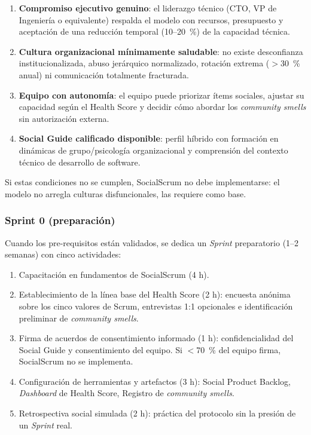 \begin{enumerate}
    \item \textbf{Compromiso ejecutivo genuino}: el liderazgo técnico (CTO, VP de Ingeniería o equivalente) respalda el modelo con recursos, presupuesto y aceptación de una reducción temporal (10--20~\%) de la capacidad técnica.
    \item \textbf{Cultura organizacional mínimamente saludable}: no existe desconfianza institucionalizada, abuso jerárquico normalizado, rotación extrema ($>$30~\% anual) ni comunicación totalmente fracturada.
    \item \textbf{Equipo con autonomía}: el equipo puede priorizar ítems sociales, ajustar su capacidad según el Health Score y decidir cómo abordar los \textit{community smells} sin autorización externa.
    \item \textbf{Social Guide calificado disponible}: perfil híbrido con formación en dinámicas de grupo/psicología organizacional y comprensión del contexto técnico de desarrollo de software.
\end{enumerate}

Si estas condiciones no se cumplen, SocialScrum no debe implementarse: el modelo no arregla culturas disfuncionales, las requiere como base.

\subsubsection{Sprint 0 (preparación)}

Cuando los pre-requisitos están validados, se dedica un \textit{Sprint} preparatorio (1--2 semanas) con cinco actividades:

\begin{enumerate}
    \item Capacitación en fundamentos de SocialScrum (4 h).
    \item Establecimiento de la línea base del Health Score (2 h): encuesta anónima sobre los cinco valores de Scrum, entrevistas 1:1 opcionales e identificación preliminar de \textit{community smells}.
    \item Firma de acuerdos de consentimiento informado (1 h): confidencialidad del Social Guide y consentimiento del equipo. Si $<$70~\% del equipo firma, SocialScrum no se implementa.
    \item Configuración de herramientas y artefactos (3 h): Social Product Backlog, \textit{Dashboard} de Health Score, Registro de \textit{community smells}.
    \item Retrospectiva social simulada (2 h): práctica del protocolo sin la presión de un \textit{Sprint} real.
\end{enumerate}

